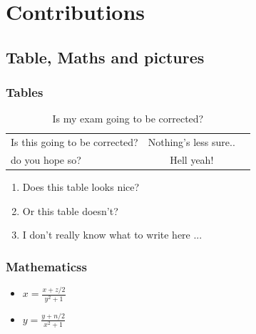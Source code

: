 \chapter{Contributions}
	\section{Table, Maths and pictures}
		\subsection{Tables}
		
		\begin{table}[!h]
		\begin{center}
			\begin{tabular}{|l||c|r}
				Is this going to be corrected? & Nothing's less sure..\\
				do you hope so? & Hell yeah!\\
			\end{tabular}
			\caption{Is my exam going to be corrected?}
			\label{sec:tables}
		\end{center}
		\end{table}
		
		\begin{enumerate}
			\item Does this table looks nice?
			\item Or this table doesn't?
			\item I don't really know what to write here ... 
		\end{enumerate}
		
		
		\subsection{Mathematicss}
			\begin{itemize}
			 	\large \item \(x= \frac{x+z/2}{y ^{2}+1}\) \label{sec:maths}
			 	\item \(y= \frac{y+n/2}{x ^{2}+1}\) 
			\end{itemize}
			
		
		\newpage
